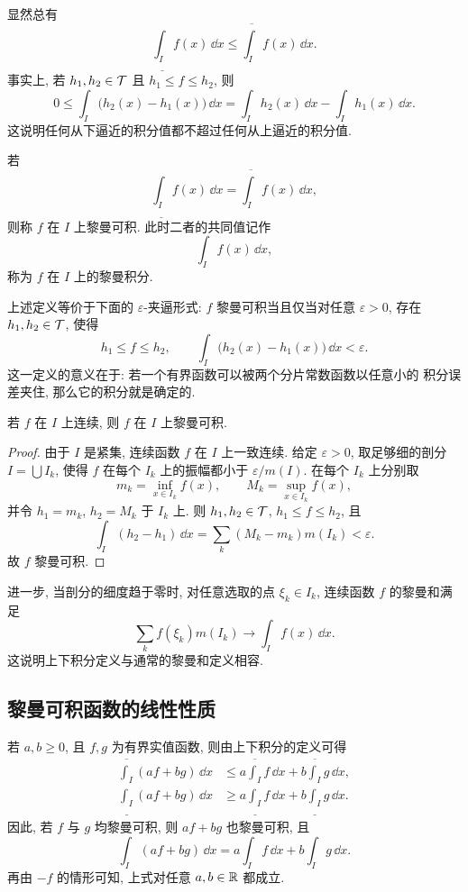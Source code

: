 显然总有
\[
\underline{\int_I} f(x)\,\dd x
\leq
\overline{\int_I} f(x)\,\dd x.
\]
事实上, 若 \(h_1,h_2\in\mathcal{T}\) 且 \(h_1\leq f\leq h_2\), 则
\[
0\leq \int_I \bigl(h_2(x)-h_1(x)\bigr)\,\dd x
=\int_I h_2(x)\,\dd x-\int_I h_1(x)\,\dd x.
\]
这说明任何从下逼近的积分值都不超过任何从上逼近的积分值.

\begin{defn}[黎曼可积]
	若
	\[
	\underline{\int_I} f(x)\,\dd x
	=
	\overline{\int_I} f(x)\,\dd x,
	\]
	则称 \(f\) 在 \(I\) 上黎曼可积. 此时二者的共同值记作
	\[
	\int_I f(x)\,\dd x,
	\]
	称为 \(f\) 在 \(I\) 上的黎曼积分.
\end{defn}

上述定义等价于下面的 \(\varepsilon\)-夹逼形式: \(f\) 黎曼可积当且仅当对任意
\(\varepsilon>0\), 存在 \(h_1,h_2\in\mathcal{T}\), 使得
\[
h_1\leq f\leq h_2,
\qquad
\int_I \bigl(h_2(x)-h_1(x)\bigr)\,\dd x<\varepsilon.
\]
这一定义的意义在于: 若一个有界函数可以被两个分片常数函数以任意小的
积分误差夹住, 那么它的积分就是确定的.

\begin{prop}
	若 \(f\) 在 \(I\) 上连续, 则 \(f\) 在 \(I\) 上黎曼可积.
\end{prop}

\begin{proof}
	由于 \(I\) 是紧集, 连续函数 \(f\) 在 \(I\) 上一致连续. 给定
	\(\varepsilon>0\), 取足够细的剖分 \(I=\bigcup I_k\), 使得 \(f\) 在每个
	\(I_k\) 上的振幅都小于 \(\varepsilon/m(I)\). 在每个 \(I_k\) 上分别取
	\[
	m_k=\inf_{x\in I_k}f(x),\qquad M_k=\sup_{x\in I_k}f(x),
	\]
	并令 \(h_1=m_k\), \(h_2=M_k\) 于 \(I_k\) 上. 则
	\(h_1,h_2\in\mathcal{T}\), \(h_1\leq f\leq h_2\), 且
	\[
	\int_I(h_2-h_1)\,\dd x
	=\sum_k(M_k-m_k)m(I_k)<\varepsilon.
	\]
	故 \(f\) 黎曼可积.
\end{proof}

进一步, 当剖分的细度趋于零时, 对任意选取的点 \(\xi_k\in I_k\), 连续函数
\(f\) 的黎曼和满足
\[
\sum_k f(\xi_k)m(I_k)\longrightarrow \int_I f(x)\,\dd x.
\]
这说明上下积分定义与通常的黎曼和定义相容.

\subsection{黎曼可积函数的线性性质}

若 \(a,b\geq 0\), 且 \(f,g\) 为有界实值函数, 则由上下积分的定义可得
\begin{align}
	\overline{\int_I} (af+bg)\,\dd x
	&\leq a\overline{\int_I} f\,\dd x
	+b\overline{\int_I} g\,\dd x,\label{eq:upper-sublinear}\\
	\underline{\int_I} (af+bg)\,\dd x
	&\geq a\underline{\int_I} f\,\dd x
	+b\underline{\int_I} g\,\dd x.\label{eq:lower-superlinear}
\end{align}
因此, 若 \(f\) 与 \(g\) 均黎曼可积, 则 \(af+bg\) 也黎曼可积, 且
\[
\int_I(af+bg)\,\dd x
=a\int_I f\,\dd x+b\int_I g\,\dd x.
\]
再由 \(-f\) 的情形可知, 上式对任意 \(a,b\in\mathbb{R}\) 都成立.

